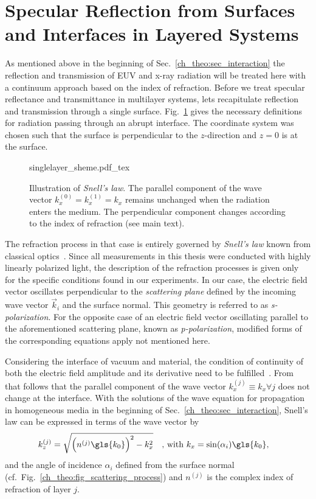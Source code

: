 \section{Specular Reflection from Surfaces and Interfaces in Layered Systems} \label{ch_theo:sec_multilayer}
As mentioned above in the beginning of Sec.~\ref{ch_theo:sec_interaction} the reflection and transmission of EUV and x-ray radiation will be treated here with a continuum approach based on the index of refraction. Before we treat specular reflectance and transmittance in multilayer systems, lets recapitulate reflection and transmission through a single surface. Fig.~\ref{ch_theo:fig_singlelayer_scheme} gives the necessary definitions for radiation passing through an abrupt interface. The coordinate system was chosen such that the surface is perpendicular to the $z$-direction and $z=0$ is at the surface.
\begin{figure}[htb]
    \def\svgwidth{0.57\textwidth}
    {singlelayer_sheme.pdf_tex}
    \caption[Illustration of \emph{Snell's law}.]{Illustration of \emph{Snell's law}. The parallel component of the wave vector $k_x^{(0)} = k_x^{(1)} = k_x$ remains unchanged when the radiation enters the medium. The perpendicular component changes according to the index of refraction (see main text).}
    \label{ch_theo:fig_singlelayer_scheme}
\end{figure}
The refraction process in that case is entirely governed by \emph{Snell's law} known from classical optics~\cite{born_principles_1965}. Since all measurements in this thesis were conducted with highly linearly polarized light, the description of the refraction processes is given only for the specific conditions found in our experiments. In our case, the electric field vector oscillates perpendicular to the \emph{scattering plane} defined by the incoming wave vector $\vec{k}_i$ and the surface normal. This geometry is referred to as \emph{s-polarization}. For the opposite case of an electric field vector oscillating parallel to the aforementioned scattering plane, known as \emph{p-polarization}, modified forms of the corresponding equations apply not mentioned here.

Considering the interface of vacuum and material, the condition of continuity of both the electric field amplitude and its derivative need to be fulfilled~\cite{born_principles_1965, gibaud_specular_2009}. From that follows that the parallel component of the wave vector $k_x^{(j)} \equiv k_x \forall j$ does not change at the interface. With the solutions of the wave equation for propagation in homogeneous media in the beginning of Sec.~\ref{ch_theo:sec_interaction}, Snell's law can be expressed in terms of the wave vector by
\begin{align}
k_z^{(j)} &= \sqrt{\Big(n^{(j)} \gls{k_0}\Big)^2 - k_x^2} \quad \text{, with } k_x = \sin(\alpha_i) \gls{k_0} \text{,} \label{ch_theo:eqn_snells_law}
\end{align}
and the angle of incidence $\alpha_i$ defined from the surface normal (cf.~Fig.~\ref{ch_theo:fig_scattering_process}) and $n^{(j)}$ is the complex index of refraction of layer $j$.

